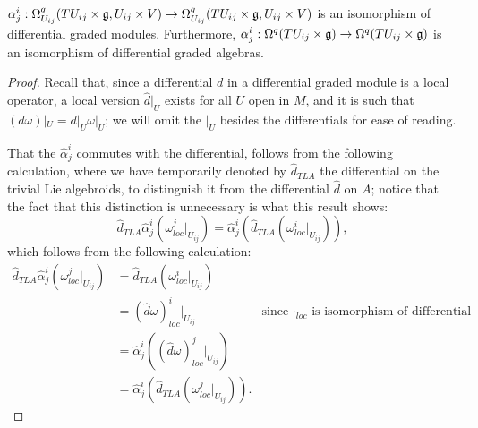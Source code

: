 \begin{theorem}\label{theoremHatAlphaRespectsDifferentialAndWedgeIsomorphismOfModulesAndAlgebra}
$\alpha^i_j: \Omega_{U_{ij}}^q(TU_{ij}\times \mathfrak{g}, U_{ij}\times V) \to \Omega_{U_{ij}}^q(TU_{ij}\times \mathfrak{g}, U_{ij}\times V)$ is an isomorphism of differential graded modules. Furthermore, $\alpha^i_j: \Omega^q(TU_{ij}\times \mathfrak{g}) \to \Omega^q(TU_{ij}\times \mathfrak{g})$ is an isomorphism of differential graded algebras.
\end{theorem}
\begin{proof}
Recall that, since a differential $d$ in a differential graded module is a local operator, a local version $\hat d|_U$ exists for all $U$ open in $M$, and it is such that $(d\omega)|_U = d|_U \omega|_U$; we will omit the $|_U$ besides the differentials for ease of reading.

That the $\hat \alpha^i_j$ commutes with the differential, follows from the following calculation, where we have temporarily denoted by $\hat d_{TLA}$ the differential on the trivial Lie algebroids, to distinguish it from the differential $\hat d$ on $A$; notice that the fact that this distinction is unnecessary is what this result shows:
\begin{equation*}
    \hat d_{TLA} \hat \alpha^i_j(\omega^j_{loc}|_{U_{ij}}) = \hat \alpha^i_j(\hat d_{TLA} (\omega^i_{loc}|_{U_{ij}})),
\end{equation*} which follows from the following calculation:
\begin{align*}
    \hat d_{TLA} \hat \alpha^i_j(\omega^j_{loc}|_{U_{ij}})
    &= \hat d_{TLA} (\omega^i_{loc}|_{U_{ij}}) \\
    &= (\hat d \omega)^i_{loc}|_{U_{ij}} & \text{since $\cdot_{loc}$ is isomorphism of differential algebras}\\
    &= \hat \alpha^i_j((\hat d \omega)^j_{loc}|_{U_{ij}}) \\
    &= \hat \alpha^i_j(\hat d_{TLA} (\omega^j_{loc}|_{U_{ij}})).
\end{align*}


\end{proof}
